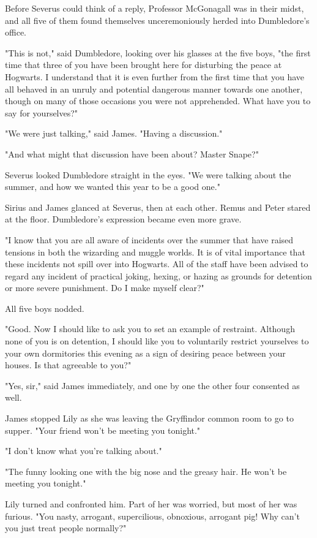 Before Severus could think of a reply, Professor McGonagall was in their midst, and all five of them found themselves unceremoniously herded into Dumbledore's office.

"This is not," said Dumbledore, looking over his glasses at the five boys, "the first time that three of you have been brought here for disturbing the peace at Hogwarts. I understand that it is even further from the first time that you have all behaved in an unruly and potential dangerous manner towards one another, though on many of those occasions you were not apprehended. What have you to say for yourselves?"

"We were just talking," said James. "Having a discussion."

"And what might that discussion have been about? Master Snape?"

Severus looked Dumbledore straight in the eyes. "We were talking about the summer, and how we wanted this year to be a good one."

Sirius and James glanced at Severus, then at each other. Remus and Peter stared at the floor. Dumbledore's expression became even more grave.

"I know that you are all aware of incidents over the summer that have raised tensions in both the wizarding and muggle worlds. It is of vital importance that these incidents not spill over into Hogwarts. All of the staff have been advised to regard any incident of practical joking, hexing, or hazing as grounds for detention or more severe punishment. Do I make myself clear?"

All five boys nodded.

"Good. Now I should like to ask you to set an example of restraint. Although none of you is on detention, I should like you to voluntarily restrict yourselves to your own dormitories this evening as a sign of desiring peace between your houses. Is that agreeable to you?"

"Yes, sir," said James immediately, and one by one the other four consented as well.

James stopped Lily as she was leaving the Gryffindor common room to go to supper. "Your friend won't be meeting you tonight."

"I don't know what you're talking about."

"The funny looking one with the big nose and the greasy hair. He won't be meeting you tonight."

Lily turned and confronted him. Part of her was worried, but most of her was furious. "You nasty, arrogant, supercilious, obnoxious, arrogant pig! Why can't you just treat people normally?"

